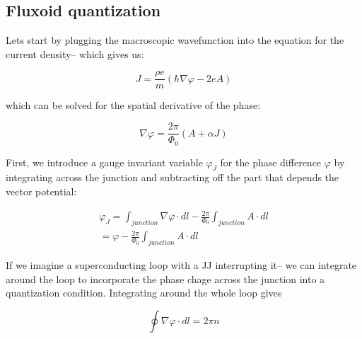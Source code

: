 \documentclass[paper=a4, twocolumn, fontsize=10pt]{article} %
\numberwithin{equation}{section} %
\numberwithin{figure}{section} %
\numberwithin{table}{section} %
\begin{document}
\subsection{Fluxoid quantization}

Lets start by plugging the macroscopic wavefunction into the equation for the current density-- which gives us:

\[ J = \frac{\rho e}{m} \left(\hbar\nabla \varphi - 2e A \right) \]

which can be solved for the spatial derivative of the phase:

\[ \nabla \varphi = \frac{2\pi}{\Phi_0} \left( A + \alpha J \right) \]


First, we introduce a gauge invariant variable $\varphi_J$ for the phase difference $\varphi$ by integrating across the junction and subtracting off the part that depends the vector potential:

\begin{align}
    \varphi_J = \int_{junction} \nabla \varphi \cdot dl -  \frac{2\pi}{\Phi_0} \int_{junction} A \cdot dl
    \\
    = \varphi -  \frac{2\pi}{\Phi_0} \int_{junction} A \cdot dl
\end{align}

If we imagine a superconducting loop with a JJ interrupting it-- we can integrate around the loop to incorporate the phase chage across the junction into a quantization condition. Integrating around the whole loop gives

\[ \oint \nabla \varphi \cdot dl = 2\pi n\]
\end{document}
